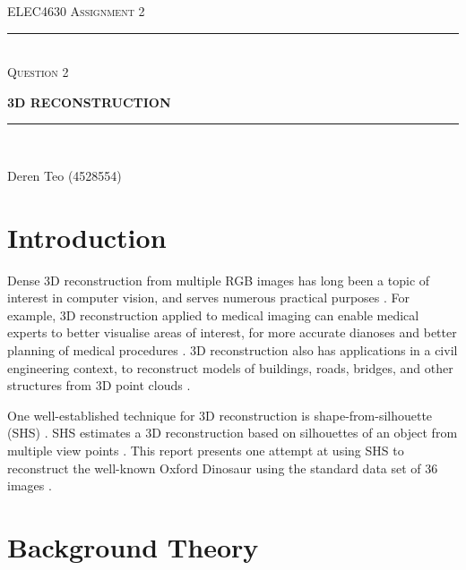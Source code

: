 \begin{titlepage}
  \centering

  \textsc{ELEC4630 Assignment 2}\\
  \vspace{9cm}

  \rule{\linewidth}{0.5pt}\\

  \vspace{1em}
  \LARGE\textsc{Question 2}\\
  \vspace{1em}

  \LARGE\uppercase{\textbf{{3D Reconstruction}}}\\

  \rule{\linewidth}{2pt}\\

  \vfill

  \normalsize{Deren Teo (4528554)}
  \vspace{1cm}

\end{titlepage}

\section{Introduction}

Dense 3D reconstruction from multiple RGB images has long been a topic of interest in computer vision, and serves numerous practical purposes \cite{ulusoy_2016}. For example, 3D reconstruction applied to medical imaging can enable medical experts to better visualise areas of interest, for more accurate dianoses and better planning of medical procedures \cite{icoi_nd}. 3D reconstruction also has applications in a civil engineering context, to reconstruct models of buildings, roads, bridges, and other structures from 3D point clouds \cite{ma_2018}.

One well-established technique for 3D reconstruction is shape-from-silhouette (SHS) \cite{cheung_2005}. SHS estimates a 3D reconstruction based on silhouettes of an object from multiple view points \cite{cheung_2005}. This report presents one attempt at using SHS to reconstruct the well-known Oxford Dinosaur using the standard data set of 36 images \cite{schoning_2015}.

\newpage
\section{Background Theory}

